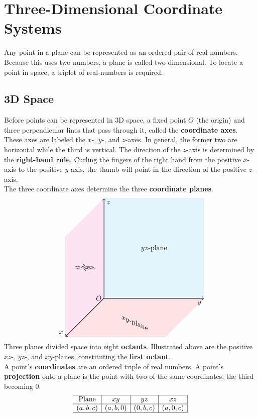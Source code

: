\documentclass[../Calculus_\Roman{3}]{subfiles}
\begin{document}
	\section{Three-Dimensional Coordinate Systems}
		Any point in a plane can be represented as an ordered pair of real numbers. Because this uses two numbers, a plane is called two-dimensional. To locate a point in space, a triplet of real-numbers is required.
		\subsection*{3D Space}
			Before points can be represented in 3D space, a fixed point $O$ (the origin) and three perpendicular lines that pass through it, called the \textbf{coordinate axes}. These axes are labeled the $x$-, $y$-, and $z$-axes. In general, the former two are horizontal while the third is vertical. The direction of the $z$-axis is determined by the \textbf{right-hand rule}. Curling the fingers of the right hand from the positive $x$-axis to the positive $y$-axis, the thumb will point in the direction of the positive $z$-axis. \\
			The three coordinate axes determine the three \textbf{coordinate planes}.
			\[\begin{tikzpicture}[xscale = 5, yscale = 5]
				\coordinate (O) at (0, 0, 0) node[anchor = east]{$O$};
				\draw[thick, ->] (0, 0, 0) -- (1, 0, 0) node[anchor = north east]{$y$};
				\draw[thick, ->] (0, 0, 0) -- (0, 1, 0) node[anchor = north west]{$z$};
				\draw[thick, ->] (0, 0, 0) -- (0, 0, 1) node[anchor = south east]{$x$};
				\draw[fill = cyan, opacity = 0.1] (0, 0, 0) -- (1, 0, 0) -- (1, 1, 0) -- (0, 1, 0);
					\node at (0.5, 0.5, 0) {$yz$-plane};
				\draw[fill = magenta, opacity = 0.1] (0, 0, 0) -- (0, 1, 0) -- (0, 1, 1) -- (0, 0, 1);
					\node[xslant = -0.7, xscale = 0.7] at (0, 0.5, 0.5) {$xz$-plane};
				\draw[fill = red, opacity = 0.1] (0, 0, 0) -- (0, 0, 1) -- (1, 0, 1) -- (1, 0, 0);
					\node[below, yslant = -0.45] at (0.5, 0, 0.5) {$xy$-plane};
			\end{tikzpicture}\]
			Three planes divided space into eight \textbf{octants}. Illustrated above are the positive $xz$-, $yz$-, and $xy$-planes, constituting the \textbf{first octant}. \\
			A point's \textbf{coordinates} are an ordered triple of real numbers. A point's \textbf{projection} onto a plane is the point with two of the same coordinates, the third becoming 0.
			\[\begin{array}{|c|c|c|c|}\hline
				\text{Plane} & xy & yz & xz \\\hline
				(a, b, c) & (a, b, 0) & (0, b, c) & (a, 0, c) \\\hline
			\end{array}\]
\end{document}
